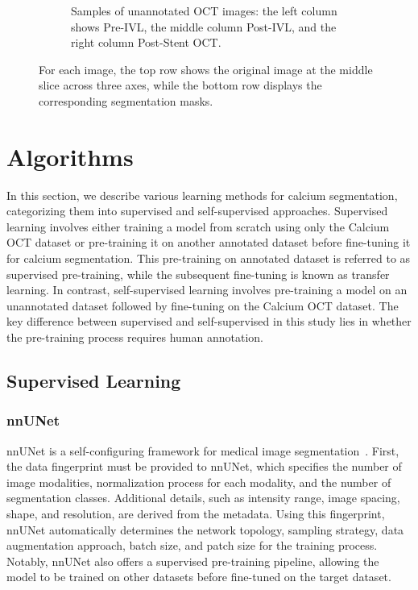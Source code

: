 \documentclass[a4paper,11pt,oneside]{report}
\begin{document}
\begin{figure}[hbt]
\begin{subfigure}[t]{0.49\textwidth}
        \caption{Samples of unannotated OCT images: the left column shows Pre-IVL, the middle column Post-IVL, and the right column Post-Stent OCT.}
        \label{fig:unannotated-oct}
    \end{subfigure}
    \caption{For each image, the top row shows the original image at the middle slice across three axes, while the bottom row displays the corresponding segmentation masks.}
\end{figure}

\newpage
\section{Algorithms}
In this section, we describe various learning methods for calcium segmentation, categorizing them into supervised and self-supervised approaches. Supervised learning involves either training a model from scratch using only the Calcium OCT dataset or pre-training it on another annotated dataset before fine-tuning it for calcium segmentation. This pre-training on annotated dataset is referred to as supervised pre-training, while the subsequent fine-tuning is known as transfer learning. In contrast, self-supervised learning involves pre-training a model on an unannotated dataset followed by fine-tuning on the Calcium OCT dataset. The key difference between supervised and self-supervised in this study lies in whether the pre-training process requires human annotation.
\subsection{Supervised Learning}
\subsubsection{nnUNet}\label{sec:design:nnunet}
nnUNet is a self-configuring framework for medical image segmentation~\cite{Isensee2020}. First, the data fingerprint must be provided to nnUNet, which specifies the number of image modalities, normalization process for each modality, and the number of segmentation classes. Additional details, such as intensity range, image spacing, shape, and resolution, are derived from the metadata. Using this fingerprint, nnUNet automatically determines the network topology, sampling strategy, data augmentation approach, batch size, and patch size for the training process. Notably, nnUNet also offers a supervised pre-training pipeline, allowing the model to be trained on other datasets before fine-tuned on the target dataset.
\end{document}
